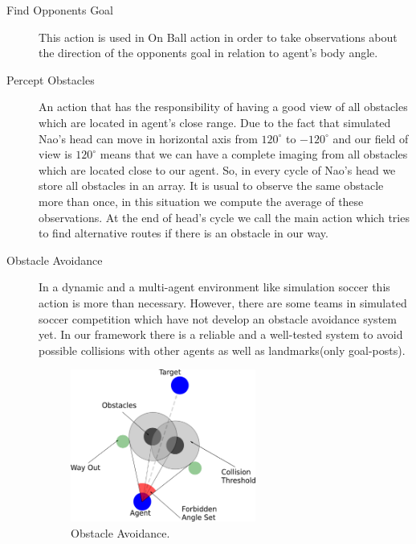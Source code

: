 \begin{description}
 
 \item[Find Opponents Goal] This action is used in On Ball action in order to take observations about the direction of the opponents goal in relation to agent's body angle.
 
 
 \item[Percept Obstacles]
 An action that has the responsibility of having a good view of all obstacles which are located in agent's close range. Due to the fact that simulated Nao's head can move in horizontal axis from $120^{\circ}$ to $-120^{\circ}$ and our field of view is $120^{\circ}$ means that we can have a complete imaging from all obstacles which are located close to our agent.
So, in every cycle of Nao's head we store all obstacles in an array. It is usual to observe the same obstacle more than once, in this situation we compute the average of these observations. At the end of head's cycle we call the main action which tries to find alternative routes if there is an obstacle in our way.


 \item[Obstacle Avoidance]
 In a dynamic and a multi-agent environment like simulation soccer this action is more than necessary. However, there are some teams in simulated soccer competition which have not develop an obstacle avoidance system yet. In our framework there is a
 reliable and a well-tested system to avoid possible collisions with other agents as well as landmarks(only goal-posts).
 
 
  \begin{figure}[t!]
  \centering
  \includegraphics[width=0.6\textwidth]{Chapter3/figures/ObstacleAvoidance.pdf}
  \caption{Obstacle Avoidance.}
  \label{fig:ObstacleAvoidance}
\end{figure} 
\end{description}

